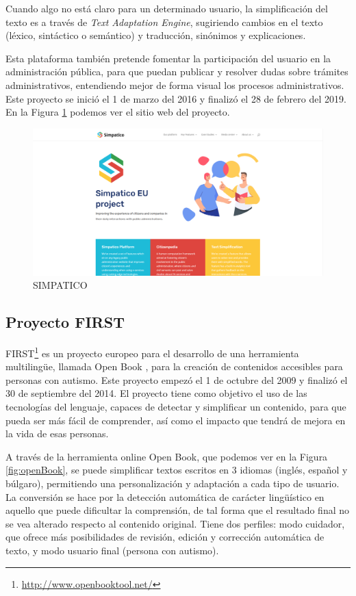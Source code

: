 Cuando algo no está claro para un determinado usuario, la simplificación del texto es a través de \textit{Text Adaptation Engine}, sugiriendo cambios en el texto (léxico, sintáctico o semántico) y traducción, sinónimos y explicaciones. 

Esta plataforma también pretende fomentar la participación del usuario en la administración pública, para que puedan publicar y resolver dudas sobre trámites administrativos, entendiendo mejor de forma visual los procesos administrativos. Este proyecto se inició el 1 de marzo del 2016 y finalizó el 28 de febrero del 2019. En la Figura \ref{fig:simpatico} podemos ver el sitio web del proyecto.


\begin{figure}[h]
	\centering
	\includegraphics[width=1.0\textwidth]{Imagenes/ProyectosMateriales/simpatico}
	\caption{SIMPATICO}
	\label{fig:simpatico}
\end{figure} 




\subsection{Proyecto FIRST}

FIRST\footnote{\href{http://www.openbooktool.net/}{http://www.openbooktool.net/}} es un proyecto europeo para el desarrollo de una herramienta multilingüe, llamada Open Book \citep{openBook}, para la creación de contenidos accesibles para personas con autismo. Este proyecto empezó el 1 de octubre del 2009 y finalizó el 30 de septiembre del 2014.
El proyecto tiene como objetivo el uso de las tecnologías del lenguaje, capaces de detectar y simplificar un contenido, para que pueda ser más fácil de comprender, así como el impacto que tendrá de mejora en la vida de esas personas. 

A través de la herramienta online Open Book, que podemos ver en la Figura \ref{fig:openBook}, se puede simplificar textos escritos en 3 idiomas (inglés, español y búlgaro), permitiendo una personalización y adaptación a cada tipo de usuario. La conversión se hace por la detección automática de carácter lingüístico en aquello que puede dificultar la comprensión, de tal forma que el resultado final no se vea alterado respecto al contenido original. Tiene dos perfiles: modo cuidador, que ofrece más posibilidades de revisión, edición y corrección automática de texto, y modo usuario final (persona con autismo). 


